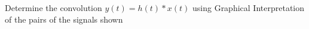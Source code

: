 \documentclass[a4paper, 10pt]{article}
\begin{document}
\newpage

\begin{problem}
Determine the convolution \( y(t) = h(t)*x(t) \) using Graphical Interpretation of the pairs of the signals shown
\end{problem}


\end{document}
